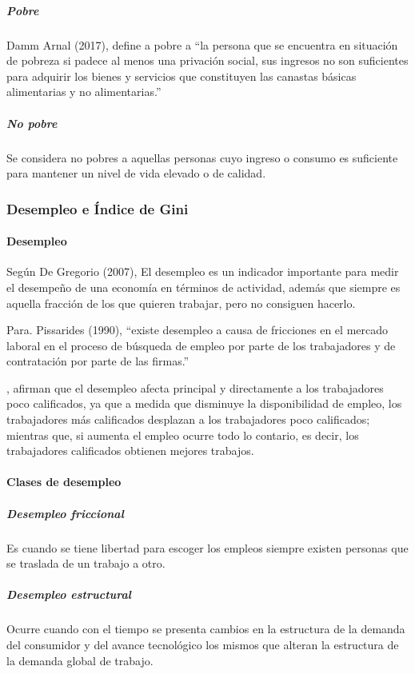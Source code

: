 \subparagraph{Pobre}

Damm Arnal (2017), define a pobre a “la persona que se encuentra en situación de pobreza si padece al menos una privación social, sus ingresos no son suficientes para adquirir los bienes y servicios que constituyen las canastas básicas alimentarias y no alimentarias.”

  \subparagraph{No pobre}

Se considera no pobres a aquellas personas cuyo ingreso o consumo es suficiente para mantener un nivel de vida elevado o de calidad.

  \subsubsection{Desempleo e Índice de Gini}

    \paragraph{Desempleo}

Según De Gregorio (2007), El desempleo es un indicador importante para medir el desempeño de una economía en términos de actividad, además que siempre es aquella fracción de los que quieren trabajar, pero no consiguen hacerlo.

Para. Pissarides (1990), “existe desempleo a causa de fricciones en el mercado laboral en el proceso de búsqueda de empleo por parte de los trabajadores y de contratación por parte de las firmas.”

\cite{Modigliani1998}, afirman que el desempleo afecta principal y directamente a los trabajadores poco calificados, ya que a medida que disminuye la disponibilidad de empleo, los trabajadores más calificados desplazan a los trabajadores poco calificados; mientras que, si aumenta el empleo ocurre todo lo contario, es decir, los trabajadores calificados obtienen mejores trabajos.


    \paragraph{Clases de desempleo}

  \subparagraph{Desempleo friccional}
Es cuando se tiene libertad para escoger los empleos siempre existen personas que se traslada de un trabajo a otro.

  \subparagraph{Desempleo estructural}
Ocurre cuando con el tiempo se presenta cambios en la estructura de la demanda del consumidor y del avance tecnológico los mismos que alteran la estructura de la demanda global de trabajo.

